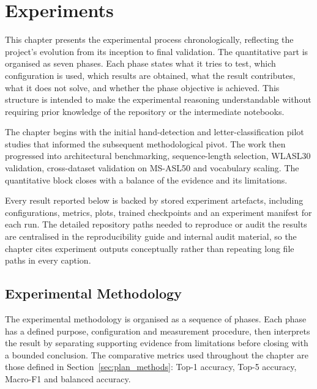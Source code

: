 \chapter{Experiments}
\label{chap:experiments}
\setcounter{section}{0}

This chapter presents the experimental process chronologically, reflecting the project's evolution
from its inception to final validation. The quantitative part is organised as seven phases. Each
phase states what it tries to test, which configuration is used, which results are obtained, what
the result contributes, what it does not solve, and whether the phase objective is achieved. This
structure is intended to make the experimental reasoning understandable without requiring prior
knowledge of the repository or the intermediate notebooks.

The chapter begins with the initial hand-detection and letter-classification pilot studies that
informed the subsequent methodological pivot. The work then progressed into architectural
benchmarking, sequence-length selection, WLASL30 validation, cross-dataset validation on MS-ASL50
and vocabulary scaling. The quantitative block closes with a balance of the evidence and its
limitations.

Every result reported below is backed by stored experiment artefacts, including configurations,
metrics, plots, trained checkpoints and an experiment manifest for each run. The detailed
repository paths needed to reproduce or audit the results are centralised in the reproducibility
guide and internal audit material, so the chapter cites experiment outputs conceptually rather than
repeating long file paths in every caption.

\section{Experimental Methodology}
\label{sec:exp_methodology}

The experimental methodology is organised as a sequence of phases. Each phase has a defined
purpose, configuration and measurement procedure, then interprets the result by separating
supporting evidence from limitations before closing with a bounded conclusion. The comparative
metrics used throughout the chapter are those defined in Section~\ref{sec:plan_methods}: Top-1
accuracy, Top-5 accuracy, Macro-F1 and balanced accuracy.

